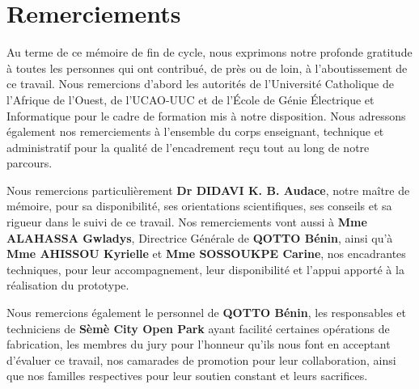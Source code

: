 \chapter*{Remerciements}

Au terme de ce mémoire de fin de cycle, nous exprimons notre profonde gratitude à toutes les personnes qui ont contribué, de près ou de loin, à l’aboutissement de ce travail. Nous remercions d’abord les autorités de l’Université Catholique de l’Afrique de l’Ouest, de l’UCAO-UUC et de l’École de Génie Électrique et Informatique pour le cadre de formation mis à notre disposition. Nous adressons également nos remerciements à l’ensemble du corps enseignant, technique et administratif pour la qualité de l’encadrement reçu tout au long de notre parcours.

Nous remercions particulièrement \textbf{Dr DIDAVI K. B. Audace}, notre maître de mémoire, pour sa disponibilité, ses orientations scientifiques, ses conseils et sa rigueur dans le suivi de ce travail. Nos remerciements vont aussi à \textbf{Mme ALAHASSA Gwladys}, Directrice Générale de \textbf{QOTTO Bénin}, ainsi qu’à \textbf{Mme AHISSOU Kyrielle} et \textbf{Mme SOSSOUKPE Carine}, nos encadrantes techniques, pour leur accompagnement, leur disponibilité et l’appui apporté à la réalisation du prototype.

Nous remercions également le personnel de \textbf{QOTTO Bénin}, les responsables et techniciens de \textbf{Sèmè City Open Park} ayant facilité certaines opérations de fabrication, les membres du jury pour l’honneur qu’ils nous font en acceptant d’évaluer ce travail, nos camarades de promotion pour leur collaboration, ainsi que nos familles respectives pour leur soutien constant et leurs sacrifices.
